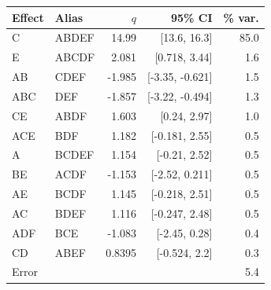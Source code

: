 \begin{tabular}{@{}llrrr@{}}
\toprule
Effect & Alias & $q$ & 95\% CI & \% var. \\
\midrule
C & ABDEF & 14.99 & [13.6, 16.3] & 85.0 \\
E & ABCDF & 2.081 & [0.718, 3.44] & 1.6 \\
AB & CDEF & -1.985 & [-3.35, -0.621] & 1.5 \\
ABC & DEF & -1.857 & [-3.22, -0.494] & 1.3 \\
CE & ABDF & 1.603 & [0.24, 2.97] & 1.0 \\
ACE & BDF & 1.182 & [-0.181, 2.55] & 0.5 \\
A & BCDEF & 1.154 & [-0.21, 2.52] & 0.5 \\
BE & ACDF & -1.153 & [-2.52, 0.211] & 0.5 \\
AE & BCDF & 1.145 & [-0.218, 2.51] & 0.5 \\
AC & BDEF & 1.116 & [-0.247, 2.48] & 0.5 \\
ADF & BCE & -1.083 & [-2.45, 0.28] & 0.4 \\
CD & ABEF & 0.8395 & [-0.524, 2.2] & 0.3 \\
Error & & & & 5.4 \\
\bottomrule
\end{tabular}
